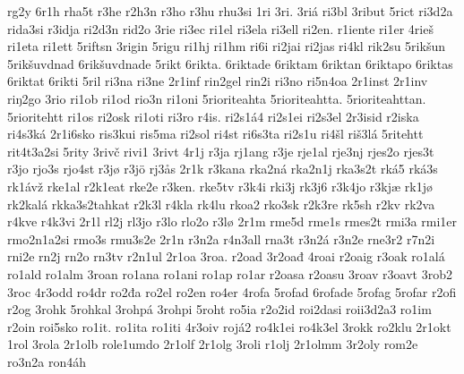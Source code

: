 {    rg2y
    6r1h
    rha5t
    r3he
    r2h3n
    r3ho
    r3hu
    rhu3si
    1ri
    3ri.
    3riá
    ri3bl
    3ribut
    5rict
    ri3d2a
    rida3si
    r3idja
    ri2d3n
    rid2o
    3rie
    ri3ec
    ri1el
    ri3ela
    ri3ell
    ri2en.
    r1iente
    ri1er
    4rieš
    ri1eta
    ri1ett
    5riftsn
    3rigin
    5rigu
    ri1hj
    ri1hm
    ri6i
    ri2jai
    ri2jas
    ri4kl
    rik2su
    5rikšun
    5rikšuvdnad
    6rikšuvdnade
    5rikt
    6rikta.
    6riktade
    6riktam
    6riktan
    6riktapo
    6riktas
    6riktat
    6rikti
    5ril
    ri3na
    ri3ne
    2r1inf
    rin2gel
    rin2i
    ri3no
    ri5n4oa
    2r1inst
    2r1inv
    riŋ2go
    3rio
    ri1ob
    ri1od
    rio3n
    ri1oni
    5rioriteahta
    5rioriteahtta.
    5rioriteahttan.
    5rioritehtt
    ri1os
    ri2osk
    ri1oti
    ri3ro
    r4is.
    ri2s1á4
    ri2s1ei
    ri2s3el
    2r3isid
    r2iska
    ri4s3ká
    2r1i6sko
    ris3kui
    ris5ma
    ri2sol
    ri4st
    ri6s3ta
    ri2s1u
    ri4šl
    riš3lá
    5ritehtt
    rit4t3a2si
    5rity
    3rivč
    rivi1
    3rivt
    4r1j
    r3ja
    rj1ang
    r3je
    rje1al
    rje3nj
    rjes2o
    rjes3t
    r3jo
    rjo3s
    rjo4st
    r3jø
    r3jö
    rj3ås
    2r1k
    r3kana
    rka2ná
    rka2n1j
    rka3s2t
    rká5
    rká3s
    rk1ávž
    rke1al
    r2k1eat
    rke2e
    r3ken.
    rke5tv
    r3k4i
    rki3j
    rk3j6
    r3k4jo
    r3kjæ
    rk1jø
    rk2kalá
    rkka3s2tahkat
    r2k3l
    r4kla
    rk4lu
    rkoa2
    rko3sk
    r2k3re
    rk5sh
    r2kv
    rk2va
    r4kve
    r4k3vi
    2r1l
    rl2j
    rl3jo
    r3lo
    rlo2o
    r3lø
    2r1m
    rme5d
    rme1s
    rmes2t
    rmi3a
    rmi1er
    rmo2n1a2si
    rmo3s
    rmu3s2e
    2r1n
    r3n2a
    r4n3all
    rna3t
    r3n2á
    r3n2e
    rne3r2
    r7n2i
    rni2e
    rn2j
    rn2o
    rn3tv
    r2n1ul
    2r1oa
    3roa.
    r2oad
    3r2oađ
    4roai
    r2oaig
    r3oak
    ro1alá
    ro1ald
    ro1alm
    3roan
    ro1ana
    ro1ani
    ro1ap
    ro1ar
    r2oasa
    r2oasu
    3roav
    r3oavt
    3rob2
    3roc
    4r3odd
    ro4dr
    ro2đa
    ro2el
    ro2en
    ro4er
    4rofa
    5rofad
    6rofade
    5rofag
    5rofar
    r2ofi
    r2og
    3rohk
    5rohkal
    3rohpá
    3rohpi
    5roht
    ro5ia
    r2o2id
    roi2dasi
    roii3d2a3
    ro1im
    r2oin
    roi5sko
    ro1it.
    ro1ita
    ro1iti
    4r3oiv
    rojá2
    ro4k1ei
    ro4k3el
    3rokk
    ro2klu
    2r1okt
    1rol
    3rola
    2r1olb
    role1umdo
    2r1olf
    2r1olg
    3roli
    r1olj
    2r1olmm
    3r2oly
    rom2e
    ro3n2a
    ron4áh
}
